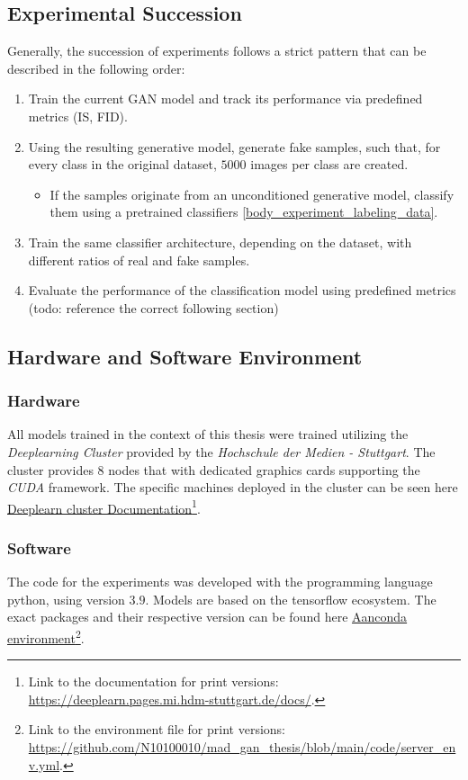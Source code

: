 \subsection{Experimental Succession}\label{body_experiment_succession}
Generally, the succession of experiments follows a strict pattern that can be described in the following order:
\begin{enumerate}
    \item Train the current GAN model and track its performance via predefined metrics (IS, FID).
    \item Using the resulting generative model, generate fake samples, such that, for every class in the original dataset, \(5000\) images per class are created.
    \begin{itemize}
        \item If the samples originate from an unconditioned generative model, classify them using a pretrained classifiers \ref{body_experiment_labeling_data}.
    \end{itemize}
    \item Train the same classifier architecture, depending on the dataset, with different ratios of real and fake samples.
    \item Evaluate the performance of the classification model using predefined metrics (todo: reference the correct following section)
\end{enumerate}

\subsection{Hardware and Software Environment}

\subsubsection{Hardware}
All models trained in the context of this thesis were trained utilizing the \textit{Deeplearning Cluster} provided by the \textit{Hochschule der Medien - Stuttgart}. The cluster provides 8 nodes that with dedicated graphics cards supporting the \textit{CUDA} framework. The specific machines deployed in the cluster can be seen here \href{https://deeplearn.pages.mi.hdm-stuttgart.de/docs/}{Deeplearn cluster Documentation}\footnote{Link to the documentation for print versions: \url{https://deeplearn.pages.mi.hdm-stuttgart.de/docs/}.}.

\subsubsection{Software}
The code for the experiments was developed with the programming language python, using version \(3.9\). Models are based on the tensorflow ecosystem. The exact packages and their respective version can be found here \href{https://github.com/N10100010/mad_gan_thesis/blob/main/code/server_env.yml}{Aanconda environment}\footnote{Link to the environment file for print versions: \url{https://github.com/N10100010/mad_gan_thesis/blob/main/code/server_env.yml}.}.



\newpage
